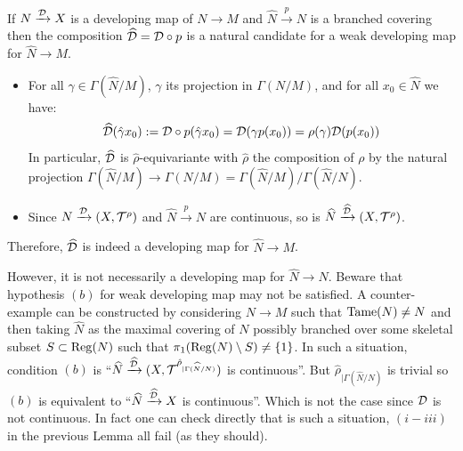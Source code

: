 \begin{rem}\label{rem:weak_dev_map_comp} If $N\xrightarrow{\mathcal{D}} X$ is a developing map of $N\rightarrow M$ and $\widehat N\xrightarrow{p} N$ is a branched covering then the composition $\widehat {\mathcal{D}}=\mathcal{D}\circ p$ is a natural candidate for a weak developing map for $\widehat N\rightarrow M$. 
\begin{itemize}
 \item For all $\hat\gamma\in \Gamma(\widehat N/M)$, $\gamma$ its projection in $\Gamma(N/M)$, and for all $x_0\in \widehat N$ we have:
 $$ \widehat {\mathcal{D}}(\hat \gamma x_0 ) := \mathcal{D}\circ p(\hat\gamma x_0) = \mathcal{D}(\gamma p(x_0)) = \rho(\gamma)\mathcal{D}( p(x_0))$$
In particular, $\widehat {\mathcal{D}}$ is $\widehat \rho$-equivariante with $\widehat \rho$ the composition of $\rho$ by the natural projection $\Gamma(\widehat N/M) \rightarrow \Gamma(N/M)=\Gamma(\widehat N/M)/\Gamma(\widehat N/N)$.

\item Since $N\xrightarrow{\mathcal{D}} (X,\mathcal{T}^\rho)$ and $\widehat N \xrightarrow{p} N$ are continuous, so is $\widehat N \xrightarrow{\widehat {\mathcal{D}}} (X,\mathcal{T}^\rho)$. 
\end{itemize}
Therefore, $\widehat {\mathcal{D}}$ is indeed a developing map for $\widehat N\rightarrow M$.

However, it is not necessarily a developing map for $\widehat N\rightarrow N$. Beware that hypothesis $(b)$ for weak developing map may not be satisfied. A counter-example can be constructed by considering $N\rightarrow M$ such that $\mathrm{Tame}(N)\neq N$ and then taking $\widehat N$ as the maximal covering of $N$ possibly branched over some skeletal subset $S\subset \mathrm{Reg}(N)$ such that $\pi_1(\mathrm{Reg}(N)\setminus S)\neq \{1\}$. In such a situation, condition $(b)$ is
``$\widehat N \xrightarrow{\widehat{\mathcal{D}}} (X,\mathcal{T}^{\hat\rho_{|\Gamma(\widehat N/N)}})$ is continuous''. But $\hat\rho_{|\Gamma(\widehat N/N)}$ is trivial so $(b)$ is equivalent to 
``$\widehat N \xrightarrow{\widehat{\mathcal{D}}} X$ is continuous''. Which is not the case since $\mathcal{D}$ is not continuous. In fact one can check directly that is such a situation,  $(i-iii)$ in the previous Lemma all fail (as they should).
\end{rem}



